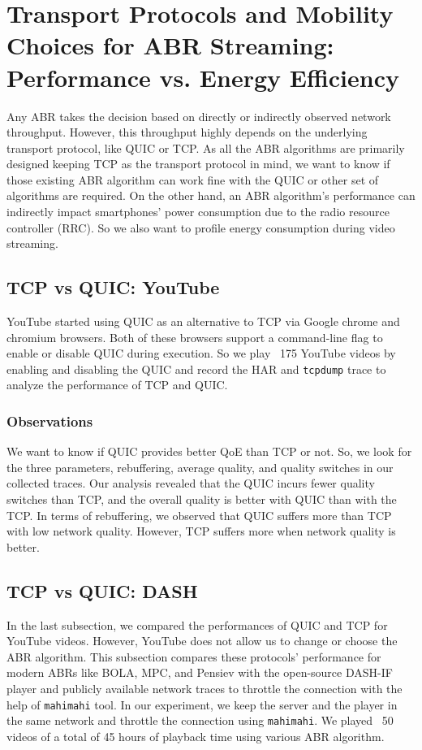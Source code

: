 \section{Transport Protocols and Mobility Choices for ABR Streaming: Performance vs. Energy Efficiency}
Any ABR takes the decision based on directly or indirectly observed network throughput. However, this throughput highly depends on the underlying transport protocol, like QUIC or TCP. As all the ABR algorithms are primarily designed keeping TCP as the transport protocol in mind, we want to know if those existing ABR algorithm can work fine with the QUIC or other set of algorithms are required. On the other hand, an ABR algorithm's performance can indirectly impact smartphones' power consumption due to the radio resource controller (RRC). So we also want to profile energy consumption during video streaming.

\subsection{TCP vs QUIC: YouTube}
YouTube started using QUIC as an alternative to TCP via Google chrome and chromium browsers. Both of these browsers support a command-line flag to enable or disable QUIC during execution. So we play ~175 YouTube videos by enabling and disabling the QUIC and record the HAR and {\tt tcpdump} trace to analyze the performance of TCP and QUIC. 

\subsubsection{Observations}
We want to know if QUIC provides better QoE than TCP or not. So, we look for the three parameters, rebuffering, average quality, and quality switches in our collected traces. Our analysis revealed that the QUIC incurs fewer quality switches than TCP, and the overall quality is better with QUIC than with the TCP. In terms of rebuffering, we observed that QUIC suffers more than TCP with low network quality. However, TCP suffers more when network quality is better.

\subsection{TCP vs QUIC: DASH}
In the last subsection, we compared the performances of QUIC and TCP for YouTube videos. However, YouTube does not allow us to change or choose the ABR algorithm. This subsection compares these protocols' performance for modern ABRs like BOLA, MPC, and Pensiev with the open-source DASH-IF player and publicly available network traces to throttle the connection with the help of {\tt mahimahi} tool. In our experiment, we keep the server and the player in the same network and throttle the connection using {\tt mahimahi}. We played ~50 videos of a total of 45 hours of playback time using various ABR algorithm.

